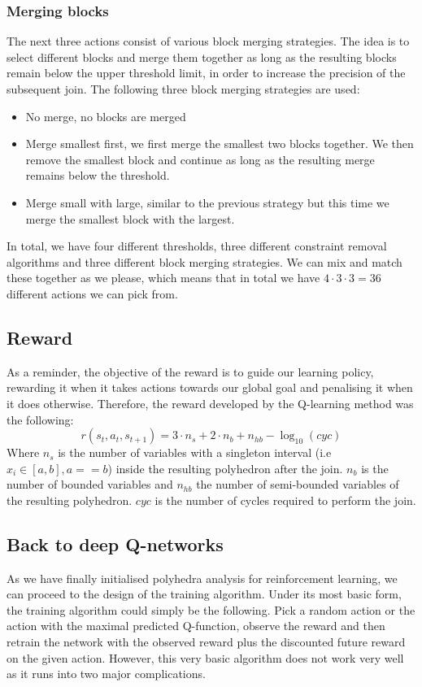 \subsubsection{Merging blocks}
The next three actions consist of various block merging strategies. The idea is to select different blocks and merge them together as long as the resulting blocks remain below the upper threshold limit, in order to increase the precision of the subsequent join. The following three block merging strategies are used:
\begin{itemize}
    \item No merge, no blocks are merged
    \item Merge smallest first, we first merge the smallest two blocks together. We then remove the smallest block and continue as long as the resulting merge remains below the threshold.
    \item Merge small with large, similar to the previous strategy but this time we merge the smallest block with the largest.
\end{itemize}

In total, we have four different thresholds, three different constraint removal algorithms and three different block merging strategies. We can mix and match these together as we please, which means that in total we have $4\cdot 3\cdot 3 =36$ different actions we can pick from.

\subsection{Reward}
As a reminder, the objective of the reward is to guide our learning policy, rewarding it when it takes actions towards our global goal and penalising it when it does otherwise. Therefore, the reward developed by the Q-learning method was the following:
\begin{equation}
    r(s_t,a_t,s_{t+1}) = 3  \cdot n_s + 2 \cdot n_b + n_{hb} - \log_{10}(cyc)
\end{equation}
Where $n_s$ is the number of variables with a singleton interval (i.e $x_i \in [a,b], a==b$) inside the resulting polyhedron after the join. $n_b$ is the number of bounded variables and $n_{hb}$ the number of semi-bounded variables of the resulting polyhedron. $cyc$ is the number of cycles required to perform the join.
\subsection{Back to deep Q-networks}
As we have finally initialised polyhedra analysis for reinforcement learning, we can proceed to the design of the training algorithm. Under its most basic form, the training algorithm could simply be the following. Pick a random action or the action with the maximal predicted Q-function, observe the reward and then retrain the network with the observed reward plus the discounted future reward on the given action. However, this very basic algorithm does not work very well as it runs into two major complications.

